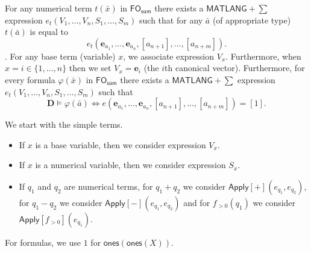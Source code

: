 For any numerical term $t(\bar x)$ in $\textsf{FO}_{\textsf{sum}}$ there exists a $\textsf{MATLANG}+\sum$ expression $e_t(V_1,\ldots,V_n,S_1,\ldots,S_m)$ such that for
any $\bar a$ (of appropriate type) $t(\bar a)$ is equal to  
$$e_t(\mathbf{e}_{a_1},\ldots,\mathbf{e}_{a_n},[a_{n+1}],\ldots,[a_{n+m}]).$$. For any base term (variable) $x$, we associate expression $V_x$. Furthermore, when $x=i\in\{1,\ldots,n\}$
then we set $V_x=\mathbf{e}_i$ (the $i$th canonical vector).
Furthermore, for every formula $\varphi(\bar x)$  in $\textsf{FO}_{\textsf{sum}}$ there exists a  $\textsf{MATLANG}+\sum$ expression $e_t(V_1,\ldots,V_n,S_1,\ldots,S_m)$ such that
$$
\mathbf{D}\models\varphi(\bar a)  \Leftrightarrow e(\mathbf{e}_{a_1},\ldots,\mathbf{e}_{a_n},[a_{n+1}],\ldots,[a_{n+m}])=[1].
$$

We start with the simple terms.
\begin{itemize}
\item If $x$ is a base variable, then we consider expression $V_{x}$.
\item If $x$ is a numerical variable, then we consider expression $S_x$.
\item If $q_1$ and $q_2$ are numerical terms, for $q_1+q_2$ we consider $\mathsf{Apply}[+](e_{q_1},e_{q_2})$, for $q_1-q_2$ we consider 
$\mathsf{Apply}[-](e_{q_1},e_{q_2})$ and for $f_{>0}(q_1)$ we consider $\mathsf{Apply}[f_{>0}](e_{q_1})$.
\end{itemize}
For formulas, we use $1$ for $\mathsf{ones}(\mathsf{ones}(X))$.
